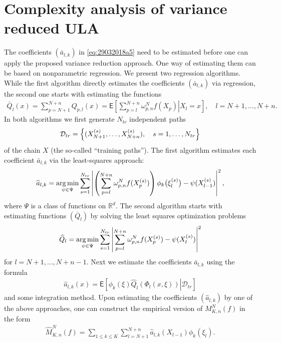 \documentclass[article]{elsarticle}
\newcommand*{\argmin}{\operatornamewithlimits{arg\,min}}
\begin{document}
\section{Complexity analysis of variance reduced ULA}
\label{sec:coeff}
The coefficients \((\bar a_{l,k})\) in \eqref{eq:29032018a5}  need to be estimated before one can apply the proposed variance reduction approach. One way of estimating them can be based on nonparametric regression.
We present two regression algorithms. While the first algorithm directly estimates  the coefficients \((\bar a_{l,k})\) via regression, the second one starts with estimating the functions
\begin{eqnarray*}
\bar{Q}_{l}(x)=\sum_{p=N+1}^{N+n}Q_{p,l}\left(x\right)=\mathsf{E}\left[\left.\sum_{p=l}^{N+n}\omega_{p,n}^{N}f(X_{p})\right|X_{l}=x\right],\quad l=N+1,\ldots,N+n.
\end{eqnarray*}
In both algorithms we first generate \(N_{tr}\)  independent paths
\[
\mathcal{D}_{tr}=\Bigl\{(X^{(s)}_{N+1},\ldots,X^{(s)}_{N+n}),\quad s=1,\ldots,N_{tr}\Bigr\}
\]
of the chain \(X\)
(the so-called ``training paths'').
The first algorithm estimates each coefficient \(\bar a_{l,k}\) via the least-squares approach:
\begin{equation}\label{eq:est_a_direct}
\widehat a_{l,k}=\argmin_{\psi\in \Psi}\sum_{s=1}^{N_{tr}} \left | \left(\sum_{p=l}^{N+n}\omega_{p,n}^{N}f(X^{(s)}_{p})\right)\phi_k\bigl(\xi^{(s)}_{l}\bigr)-\psi(X^{(s)}_{l-1})\right|^2,
\end{equation}
where \(\Psi\) is a  class of  functions on \(\mathbb{R}^d.\)
The second algorithm starts with estimating  functions \((\bar Q_{l})\) by solving  the least squares optimization problems
\begin{equation}\label{eq:06042018a1}
{\widehat  Q}_{l}=\argmin_{\psi\in \Psi}\sum_{s=1}^{N_{tr}} \left | \sum_{p=l}^{N+n}\omega_{p,n}^{N}f(X^{(s)}_{p})-\psi(X^{(s)}_{l})\right|^2
\end{equation}
for \(l=N+1,\ldots, N+n-1.\)
Next  we estimate the coefficients \( \bar a_{l,k}\) using
the formula
\begin{eqnarray}
\label{eq:a_est_int}
\widehat a_{l,k}(x)=\mathsf{E}\left[\left.\phi_k\left(\xi\right)\widehat Q_{l}\left(\Phi_l(x,\xi)\right)\right | \mathcal{D}_{tr}\right]
\end{eqnarray}
and some integration method. Upon estimating  the coefficients \((\widehat a_{l,k})\) by one of the above approaches, one can construct the empirical version of \(M_{K,n}^N(f)\) in the form
\begin{eqnarray*}
\widehat M_{K,n}^N(f) =\sum_{1\leq  k \le K}\sum_{l=N+1}^{N+n}\widehat a_{l,k}(X_{l-1})\phi_k(\xi_{l}).
\end{eqnarray*}
\end{document}
